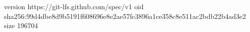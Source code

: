 version https://git-lfs.github.com/spec/v1
oid sha256:99d4dbe8d9b5191f608696e8e2ae57fc3896a1ce358c8e511ac2bdb22b4ad3e2
size 196704
